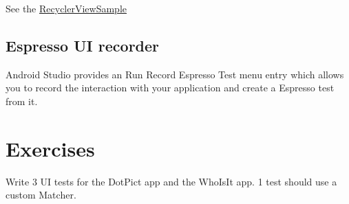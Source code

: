 See the \href{https://github.com/googlesamples/android-testing/tree/master/ui/espresso/RecyclerViewSample}{RecyclerViewSample }

\subsection{Espresso UI recorder}
Android Studio provides an Run Record Espresso Test menu entry which allows you to record the interaction with your application and create a Espresso test from it.


\newpage
\section{Exercises}
\begin{exercise}
	Write 3 UI tests for the DotPict app and the WhoIsIt app. 1 test should use a custom Matcher.
	
\end{exercise}